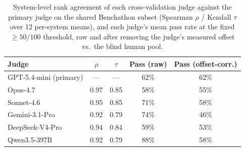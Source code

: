 \begin{table}[t]
\centering\footnotesize
\caption{System-level rank agreement of each cross-validation judge against the primary judge on the shared Benchathon subset (Spearman $\rho$ / Kendall $\tau$ over 12 per-system means), and each judge's mean pass rate at the fixed $\geq 50/100$ threshold, raw and after removing the judge's measured offset vs.\ the blind human pool.}
\label{tbl-judge-swap-agreement}
\setlength{\tabcolsep}{4pt}
\begin{tabular*}{\textwidth}{@{\extracolsep{\fill}}lcccc@{}}
\toprule
Judge & $\rho$ & $\tau$ & Pass (raw) & Pass (offset-corr.) \\
\midrule
GPT-5.4-mini (primary) & — & — & 62\% & 62\% \\
Opus-4.7 & 0.97 & 0.85 & 58\% & 55\% \\
Sonnet-4.6 & 0.95 & 0.85 & 71\% & 58\% \\
Gemini-3.1-Pro & 0.92 & 0.79 & 74\% & 46\% \\
DeepSeek-V4-Pro & 0.94 & 0.84 & 59\% & 53\% \\
Qwen3.5-397B & 0.92 & 0.79 & 88\% & 58\% \\
\bottomrule
\end{tabular*}
\end{table}
